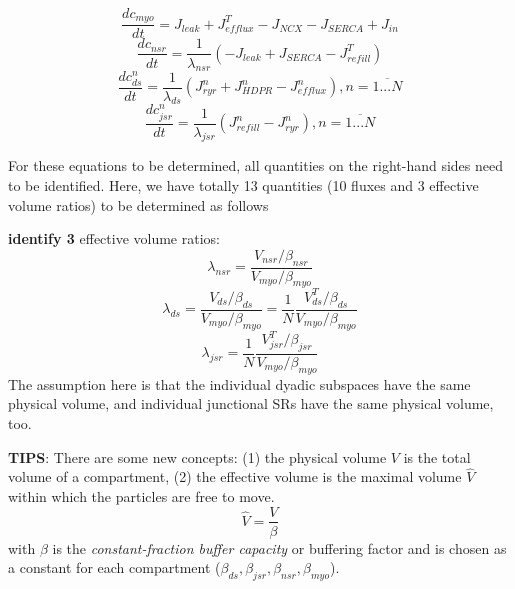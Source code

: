 \begin{equation}
  \label{eq:168}
  \frac{dc_{myo}}{dt} =  J_{leak}+J^T_{efflux} - J_{NCX} - J_{SERCA} +
  J_{in} 
\end{equation}
\begin{equation}
  \label{eq:185}
  \frac{dc_{nsr}}{dt} = \frac{1}{\lambda_{nsr}} \left( -J_{leak} +
    J_{SERCA} - J^T_{refill} \right)
\end{equation}
\begin{equation}
  \label{eq:183}
  \frac{dc^n_{ds}}{dt} = \frac{1}{\lambda_{ds}} \left(  J^n_{ryr} +
    J^n_{HDPR} - J^n_{efflux}  \right), n=\overline{1...N}
\end{equation}
\begin{equation}
  \label{eq:184}
  \frac{dc^n_{jsr}}{dt} = \frac{1}{\lambda_{jsr}} \left( J^n_{refill}
    -J^n_{ryr} \right), n=\overline{1...N}
\end{equation}

For these equations to be determined, all quantities on the right-hand
sides need to be identified. Here, we have totally 13 quantities (10
fluxes and 3 effective volume ratios) to be determined as follows

{\bf identify 3} effective volume ratios: 
\begin{equation}
  \label{eq:186}
  \lambda_{nsr} = \frac{V_{nsr}/\beta_{nsr}}{V_{myo}/\beta_{myo}} 
\end{equation}
\begin{equation}
  \label{eq:187}
  \lambda_{ds} =\frac{V_{ds}/\beta_{ds}}{V_{myo}/\beta_{myo}} = \frac{1}{N}\frac{V^T_{ds}/\beta_{ds}}{V_{myo}/\beta_{myo}}
\end{equation}
\begin{equation}
  \label{eq:188}
  \lambda_{jsr} = \frac{1}{N}\frac{V^T_{jsr}/\beta_{jsr}}{V_{myo}/\beta_{myo}}
\end{equation}
The assumption here is that the individual dyadic subspaces have the
same physical volume, and individual junctional SRs have the same
physical volume, too. 

{\bf TIPS}: There are some new concepts: (1) the physical volume $V$
is the total volume of a compartment, (2) the effective volume is the
maximal volume $\hat{V}$ within which the particles are free to move.
\begin{equation}
  \label{eq:171}
  \hat{V} = \frac{V}{\beta}
\end{equation}
with $\beta$ is the {\it constant-fraction  buffer capacity}
or buffering factor and is chosen as a constant for each compartment
($\beta_{ds}, \beta_{jsr}, \beta_{nsr}, \beta_{myo}$).

